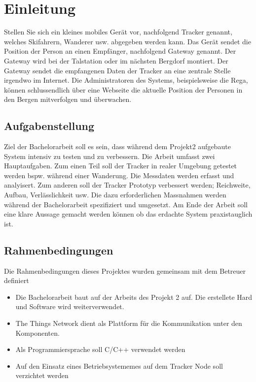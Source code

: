 \documentclass[11pt,english,german]{report}
\theoremstyle{definition}
\begin{document}
\tableofcontents


\chapter{Einleitung}
Stellen Sie sich ein kleines mobiles Gerät vor, nachfolgend Tracker genannt, welches Skifahrern, Wanderer usw. abgegeben werden kann. Das Gerät sendet die Position der Person an einen Empfänger, nachfolgend Gateway genannt. Der Gateway wird bei der Talstation oder im nächsten Bergdorf montiert. Der Gateway sendet die empfangenen Daten der Tracker an eine zentrale Stelle irgendwo im Internet. Die Administratoren des Systems, beispielsweise die Rega, können schlussendlich über eine Webseite die aktuelle Position der Personen in den Bergen mitverfolgen und überwachen.

\section{Aufgabenstellung}
Ziel der Bachelorarbeit soll es sein, dass während dem Projekt2 aufgebaute System intensiv zu testen und zu verbessern. Die Arbeit umfasst zwei Hauptaufgaben. Zum einen Teil soll der Tracker in realer Umgebung getestet werden bspw. während einer Wanderung. Die Messdaten werden erfasst und analyisert. Zum anderen soll der Tracker Prototyp verbessert werden; Reichweite, Aufbau, Verlässlichkeit usw. Die dazu erforderlichen Massnahmen werden während der Bachelorarbeit spezifiziert und umgesetzt. Am Ende der Arbeit soll eine klare Aussage gemacht werden können ob das erdachte System praxistauglich ist.


\section{Rahmenbedingungen}
Die Rahmenbedingungen dieses Projektes wurden gemeinsam mit dem Betreuer definiert
\begin{itemize}
\item Die Bachelorarbeit baut auf der Arbeits des Projekt 2 auf. Die erstellete Hard und Software wird weiterverwendet.
\item The Things Network dient als Plattform für die Kommunikation unter den Komponenten.
\item Als Programmiersprache soll C/C++ verwendet werden
\item Auf den Einsatz eines Betriebsystememes auf dem Tracker Node soll verzichtet werden
\end{itemize}
\end{document}
